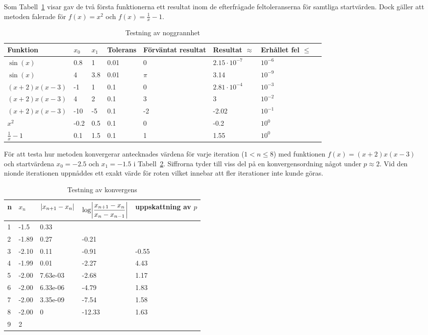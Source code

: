 \documentclass[12pt]{article}
\DeclarePairedDelimiter\abs{\lvert}{\rvert}
\begin{document}
Som Tabell~\ref{noggrannhet} visar gav de två första funktionerna ett resultat inom de efterfrågade feltoleranserna för samtliga startvärden. Dock gäller att metoden falerade för $f(x) = x^2$ och $f(x)=\frac{1}{x} - 1$.
\begin{table}[H]
  \centering
  \begin{tabu}{ l l l l l l l l }
    Funktion & $x_0$ & $x_1$ & Tolerans & Förväntat resultat & Resultat $\approx$ & Erhållet fel $\leq$ \\
    \toprule
    $\sin(x)$ & 0.8 & 1 & 0.01 & 0 & $2.15 \cdot 10^{-7}$ & $10^{-6}$ \\
    $\sin(x)$ & 4 & 3.8 & 0.01 & $\pi$ & 3.14 & $10^{-9} $\\
    $ (x+2) x (x-3)$ & -1 & 1 & 0.1 & 0 & $2.81 \cdot 10^{-4}$ & $10^{-3}$ \\
    $ (x+2) x (x-3)$ & 4 & 2 & 0.1 & 3 & 3 & $10^{-2}$ \\
    $ (x+2) x (x-3)$ & -10 & -5 & 0.1 & -2 & -2.02 & $10^{-1}$ \\
    $ x^{2}$ & -0.2 & 0.5 & 0.1 & 0 & -0.2  & $10^{0} $ \\
    $ \frac{1}{x} - 1 $ & 0.1 & 1.5 & 0.1 & 1 & 1.55 & $10^{0}$ \\
  \end{tabu}
  \caption{Testning av noggrannhet}\label{noggrannhet}
\end{table}

För att testa hur metoden konvergerar antecknades värdena för varje iteration ($1 < n \leq 8$) med funktionen $f(x)=(x+2) x (x-3)$ och startvärdena $x_0=-2.5$ och $x_1=-1.5$ i Tabell~\ref{konvergens}. Siffrorna tyder till viss del på en konvergensordning något under $p\approx 2$. Vid den nionde iterationen uppnåddes ett exakt värde för roten vilket innebar att fler iterationer inte kunde göras.

\begin{table}[H]
  \centering
  \begin{tabu}{l l l l l}
    n & $x_n$ & $\abs{x_{n+1}-x_n}$ & $\log\abs*{\dfrac{x_{n+1}-x_n}{x_n-x_{n-1}}}$ & uppskattning av $p$\\
     & -1.5  & 0.33 \\
    2 & -1.89 & 0.27     & -0.21  & \\
    3 & -2.10 & 0.11     & -0.91  & -0.55 \\
    4 & -1.99 & 0.01     & -2.27  & 4.43 \\
    5 & -2.00 & 7.63e-03 & -2.68  & 1.17 \\
    6 & -2.00 & 6.33e-06 & -4.79  & 1.83 \\
    7 & -2.00 & 3.35e-09 & -7.54  & 1.58 \\
    8 & -2.00 & 0        & -12.33 & 1.63 \\
    9 & 2
  \end{tabu}
  \caption{Testning av konvergens}\label{konvergens}
\end{table}
\end{document}

